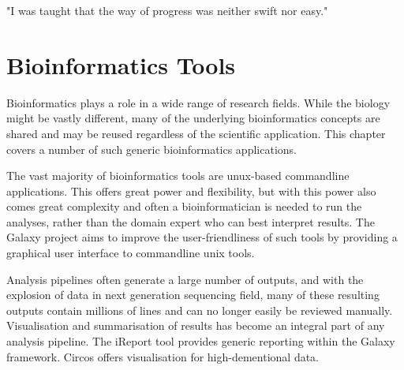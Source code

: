 \begin{savequote}[75mm]
"I was taught that the way of progress was neither swift nor easy."
\end{savequote}

\chapter{Bioinformatics Tools}
\label{chapter:general}
\setcounter{figure}{-1}
\setcounter{table}{-1}
\setcounter{section}{-1}
\setcounter{NAT@ctr}{-1}

\begin{comment}
iReport, Circos?, myFAIR?, Galaxy2018update? (I am co-author and technically everybody is
shared first on that? would fit nicely with the overall story as every other paper connects
to Galaxy.)
- Training paper in its own section or add it here?
\end{comment}

Bioinformatics plays a role in a wide range of research fields. While the biology might be vastly different, many of the underlying bioinformatics concepts are shared and may be reused regardless of the scientific application. This chapter covers a number of such generic bioinformatics applications.

The vast majority of bioinformatics tools are unux-based commandline applications. This offers great power and flexibility, but with this power also comes great complexity and often a bioinformatician is needed to run the analyses, rather than the domain expert who can best interpret results. The Galaxy project aims to improve the user-friendliness of such tools by providing a graphical user interface to commandline unix tools.

Analysis pipelines often generate a large number of outputs, and with the explosion of data in next generation sequencing field, many of these resulting outputs contain millions of lines and can no longer easily be reviewed manually. Visualisation and summarisation of results has become an integral part of any analysis pipeline. The iReport tool provides generic reporting within the Galaxy framework. Circos offers visualisation for high-dementional data.

\begin{comment}
Contents of this chapter:
\begin{enumerate}
\itemsep-0.5em
\item The Galaxy platform for accessible, reprodu- cible and collaborative biomedical analyses: 2018 update
\item iReport: A generalised Galaxy solution for integrated experimental reporting
\item Galactic Circos: Visualisation of high-dimensional data in Galaxy
\end{enumerate}
\end{comment}
